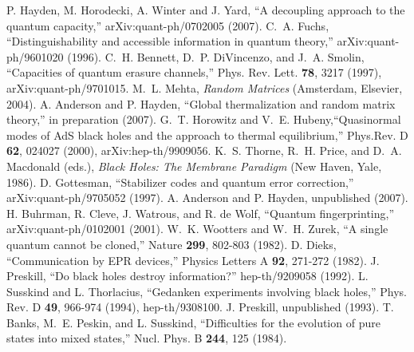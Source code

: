 \documentclass[11pt]{article}
\begin{document}
\begin{thebibliography}{99}
 P. Hayden, M. Horodecki, A. Winter and J. Yard, ``A decoupling approach to the quantum capacity,'' arXiv:quant-ph/0702005 (2007).
 C.~A. Fuchs, ``Distinguishability and accessible information in quantum theory,'' arXiv:quant-ph/9601020 (1996). 
 C.~H. Bennett, D.~P. DiVincenzo, and J.~A. Smolin, ``Capacities of quantum erasure channels,'' Phys. Rev. Lett. {\bf 78}, 3217 (1997), arXiv:quant-ph/9701015. 
 M.~L. Mehta, {\em Random Matrices} (Amsterdam, Elsevier, 2004). 
 A. Anderson and P. Hayden, ``Global thermalization and random matrix
theory,'' in preparation (2007).
 G.~T. Horowitz and V.~E. Hubeny,``Quasinormal modes of AdS black holes and the approach to thermal equilibrium,'' Phys.Rev. D {\bf 62}, 024027 (2000), arXiv:hep-th/9909056.
 K.~S. Thorne, R.~H. Price, and D.~A. Macdonald (eds.), {\em Black Holes: The Membrane Paradigm} (New Haven, Yale, 1986).
 D. Gottesman, ``Stabilizer codes and quantum error correction,'' arXiv:quant-ph/9705052 (1997). 
 A. Anderson and P. Hayden, unpublished (2007).
  H. Buhrman, R. Cleve, J. Watrous, and R. de Wolf, ``Quantum fingerprinting,'' arXiv:quant-ph/0102001 (2001).
 W.~K. Wootters and W.~H. Zurek, ``A single quantum cannot be cloned,'' Nature {\bf 299}, 802-803 (1982).
 D. Dieks, ``Communication by EPR devices,'' Physics Letters A {\bf 92}, 271-272 (1982).
 J. Preskill, ``Do black holes destroy information?'' hep-th/9209058 (1992).
 L. Susskind and L. Thorlacius, ``Gedanken experiments involving black holes,'' Phys. Rev. D {\bf 49}, 966-974 (1994), hep-th/9308100.
 J. Preskill, unpublished (1993).
 T. Banks, M.~E. Peskin, and L. Susskind, ``Difficulties for the evolution of pure states into mixed states,'' Nucl. Phys. B {\bf 244}, 125 (1984).

\end{thebibliography}
\end{document}
